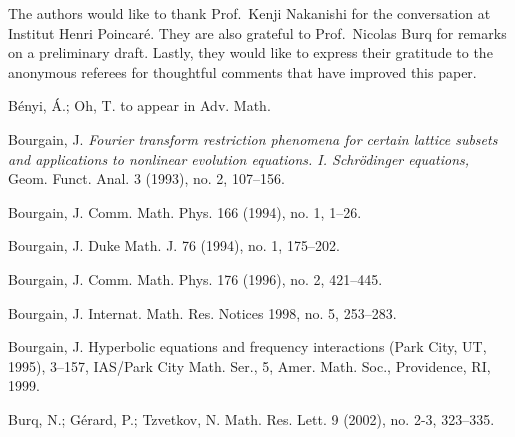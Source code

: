 \documentclass[11pt]{amsart}
\numberwithin{equation}{section} \numberwithin{theorem}{section}
\begin{document}
\medskip

 The authors would like to thank Prof.~Kenji Nakanishi for the conversation at Institut Henri Poincar\'e. 
They are also grateful to Prof.~Nicolas Burq for remarks on a preliminary draft.
Lastly, they would like to express their gratitude to the anonymous referees for thoughtful
comments that have improved this paper. 

	
	
	
	
	
	\begin{thebibliography}{99}

	B{\'e}nyi, {\'A}.;  Oh, T.
	\newblock to appear in Adv. Math. 

	
	Bourgain, J.
	\newblock 
	{\it Fourier transform restriction phenomena for certain lattice subsets and applications 
	to nonlinear evolution equations. I. Schr\"odinger equations,}  
		\newblock Geom. Funct. Anal.  3  (1993),  no. 2, 107--156.

	Bourgain, J.
	\newblock  Comm. Math. Phys.  166  (1994),  no. 1, 1--26.

	Bourgain, J.
	\newblock Duke Math. J.  76  (1994),  no. 1, 175--202.

  

	Bourgain, J.
	\newblock   Comm. Math. Phys.  176  (1996),  no. 2, 421--445.

	Bourgain, J.
	\newblock Internat. Math. Res. Notices 1998, no. 5, 253--283. 

	Bourgain, J.
	\newblock  Hyperbolic equations and frequency interactions (Park City, UT, 1995),  3--157, 
	IAS/Park City Math. Ser., 5, Amer. Math. Soc., Providence, RI, 1999. 
	
Burq, N.; G\'erard, P.; Tzvetkov, N.
	\newblock    Math. Res. Lett.  9  (2002),  no. 2-3, 323--335. 


\end{thebibliography}
\end{document}
